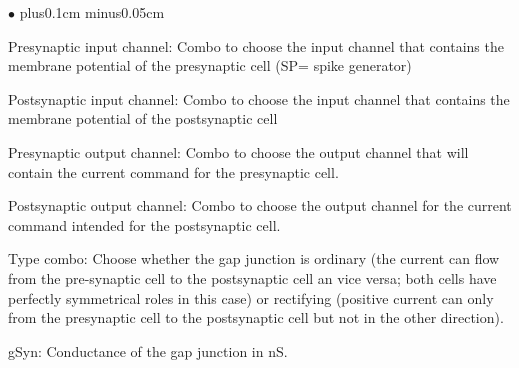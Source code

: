 \documentclass{article}
\newenvironment{myitem}{\begin{list}{$\bullet$}{\setlength{\leftmargin}{1.1em}
\itemsep0.1cm plus0.1cm minus0.05cm
\listparindent0cm
\addtolength{\labelsep}{0.5\labelsep}
\setlength{\labelwidth}{0.8em}
\setlength{\leftmargin}{\labelwidth}
\addtolength{\leftmargin}{\labelsep}
}}{\end{list}}
\begin{document}
\begin{myitem}
\item Presynaptic input channel: Combo to choose the input channel
  that contains the membrane potential of the presynaptic cell (SP= spike
  generator) 
\item Postsynaptic input channel: Combo to choose the input channel
  that contains the membrane potential of the postsynaptic cell 
\item Presynaptic output channel: Combo to choose the output channel
  that will contain the current command for the presynaptic cell. 
\item Postsynaptic output channel: Combo to choose the output channel
  for the current command intended for the postsynaptic cell.
\item Type combo: Choose whether the gap junction is ordinary (the
  current can flow from the pre-synaptic cell to the postsynaptic cell
  an vice versa; both cells have perfectly symmetrical roles in this
  case) or rectifying (positive current can only from the presynaptic
  cell to the postsynaptic cell but not in the other direction). 
\item gSyn: Conductance of the gap junction in nS.  
\end{myitem}
\end{document}
